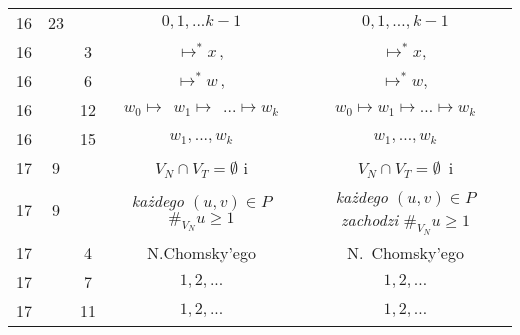 \documentclass[a4paper,11pt]{article}
\begin{document}
\begin{center}
\begin{tabular}{|c|c|c|c|c|}
    16  & 23 & & $0, 1, ...k - 1$ & $0, 1, \ldots, k - 1$ \\
    16  & &  3 & $\mapsto^{ * } x \, ,$ & $\mapsto^{ * } x,$ \\
    16  & &  6 & $\mapsto^{ * } w \, ,$ & $\mapsto^{ * } w,$ \\
    16  & & 12 & $w_{ 0 } \mapsto \;\, w_{ 1 } \mapsto \;\, ... \mapsto w_{ k }$
    & $w_{ 0 } \mapsto w_{ 1 } \mapsto \ldots \mapsto w_{ k }$ \\
    16  & & 15 & $w_{ 1 }, ..., w_{ k }$ & $w_{ 1 }, \ldots, w_{ k }$ \\
    17  &  9 & & $V_{ N } \cap V_{ T } = \emptyset${ }{ }{ }i
    & $V_{ N } \cap V_{ T } = \emptyset$~i \\
    17  &  9 & & \textit{każdego}{ }{ }$( u, v ) \in P${ }{ }
               $\#_{ V_{ N } } u \geq 1$
    & \textit{każdego} $( u, v ) \in P$ \textit{zachodzi}
      $\#_{ V_{ N } } u \geq 1$ \\
    17  & &  4 & N.Chomsky’ego & N.~Chomsky’ego \\
    17  & &  7 & $1, 2, ...$ & $1, 2, \ldots$ \\
    17  & & 11 & $1, 2, ...$ & $1, 2, \ldots$ \\
    \hline
  \end{tabular}






\end{center}
\end{document}
